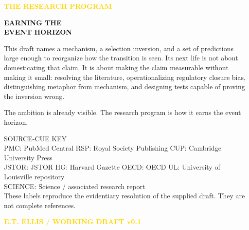 \documentclass[10pt]{article}
\newcommand{\letterspace}[1]{\addfontfeatures{LetterSpace=#1}}
\begin{document}
\clearpage
\thispagestyle{empty}
\vspace*{1.1in}
{\sffamily\bfseries\fontsize{9}{11}\selectfont\letterspace{180}\textcolor{Gold}{THE RESEARCH PROGRAM}}\par
\vspace{0.3in}
{\sffamily\bfseries\fontsize{25}{29}\selectfont\textcolor{Paper}{EARNING THE\\EVENT HORIZON}}\par
\vspace{0.28in}
\begin{minipage}{0.83\linewidth}
{\fontsize{11.2}{16}\selectfont\color{Paper!90}
This draft names a mechanism, a selection inversion, and a set of predictions large enough to reorganize how the transition is seen. Its next life is not about domesticating that claim. It is about making the claim measurable without making it small: resolving the literature, operationalizing regulatory closure bias, distinguishing metaphor from mechanism, and designing tests capable of proving the inversion wrong.

The ambition is already visible. The research program is how it earns the event horizon.}
\end{minipage}

\vfill
{\sffamily\fontsize{8}{11}\selectfont\color{Paper!60}
SOURCE-CUE KEY\\[0.12in]
PMC: PubMed Central \;\textbullet\; RSP: Royal Society Publishing \;\textbullet\; CUP: Cambridge University Press\\
JSTOR: JSTOR \;\textbullet\; HG: Harvard Gazette \;\textbullet\; OECD: OECD \;\textbullet\; UL: University of Louisville repository\\
SCIENCE: Science / associated research report\\[0.18in]
These labels reproduce the evidentiary resolution of the supplied draft. They are not complete references.}

\vspace{0.35in}
{\sffamily\bfseries\fontsize{8}{10}\selectfont\letterspace{90}\textcolor{Gold}{E.T. ELLIS \; / \; WORKING DRAFT v0.1}}
\end{document}

